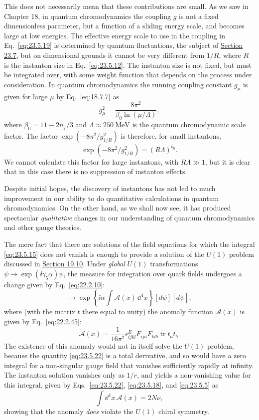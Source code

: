 This does not necessarily mean that these contributions are small. As we
saw in Chapter 18, in quantum chromodynamics the coupling $g$ is not a
fixed dimensionless parameter, but a function of a sliding energy scale,
and becomes large at low energies. The effective energy scale to use in
the coupling in Eq.~\eqref{eq:23.5.19} is determined by quantum
fluctuations, the subject of \hyperref[sec:23.7]{Section 23.7}, but on dimensional grounds it
cannot be very different from $1/R$, where $R$ is the instanton size in
Eq.~\eqref{eq:23.5.12}. The instanton size is not fixed, but must be
integrated over, with some weight function that depends on the process
under consideration. In quantum chromodynamics the running coupling
constant $g_\mu$ is given for large $\mu$ by Eq.~\eqref{eq:18.7.7} as
\[
g_\mu^2=\frac{8\pi^2}{\beta_0\ln(\mu/\Lambda)},
\]
where $\beta_0=11-2n_f/3$ and $\Lambda\approx250\ \mathrm{MeV}$ is the
quantum chromodynamic scale factor. The factor
$\exp(-8\pi^2/g_{1/R}^2)$ is therefore, for small instantons,
\[
\exp\left(-8\pi^2/g_{1/R}^2\right)=(R\Lambda)^{b_0}.
\]
We cannot calculate this factor for large instantons, with
$R\Lambda\gg1$, but it is clear that in this case there is no suppression
of instanton effects.

Despite initial hopes, the discovery of instantons has not led to much
improvement in our ability to do quantitative calculations in quantum
chromodynamics. On the other hand, as we shall now see, it has produced
spectacular \emph{qualitative} changes in our understanding of quantum
chromodynamics and other gauge theories.

The mere fact that there are solutions of the field equations for which
the integral \eqref{eq:23.5.15} does not vanish is enough to provide a
solution of the $U(1)$ problem discussed in \hyperref[sec:19.10]{Section 19.10}. Under
\emph{global} $U(1)$ transformations
$\psi\to\exp(\ii\gamma_5\alpha)\psi$, the measure for integration over
quark fields undergoes a change given by Eq.~\eqref{eq:22.2.10}:
\begin{equation}
[d\psi][d\overline\psi]\longrightarrow
\exp\left\{\ii\alpha\int\mathcal A(x)\,\dd^4x\right\}
[d\psi][d\overline\psi],
\tag{23.5.21}\label{eq:23.5.21}
\end{equation}
where (with the matrix $t$ there equal to unity) the anomaly function
$\mathcal A(x)$ is given by Eq.~\eqref{eq:22.2.45}:
\begin{equation}
\mathcal A(x)=\frac{1}{16\pi^2}\epsilon^E_{ijkl}
F_{ija}F_{klb}\operatorname{tr}t_a t_b.
\tag{23.5.22}\label{eq:23.5.22}
\end{equation}
The existence of this anomaly would not in itself solve the $U(1)$
problem, because the quantity \eqref{eq:23.5.22} is a total derivative,
and so would have a zero integral for a non-singular gauge field that
vanishes sufficiently rapidly at infinity. The instanton solution
vanishes only as $1/r$, and yields a non-vanishing value for this
integral, given by Eqs.~\eqref{eq:23.5.22}, \eqref{eq:23.5.18}, and
\eqref{eq:23.5.5} as
\begin{equation}
\int \dd^4x\,\mathcal A(x)=2N\nu,
\tag{23.5.23}\label{eq:23.5.23}
\end{equation}
showing that the anomaly \emph{does} violate the $U(1)$ chiral symmetry.

